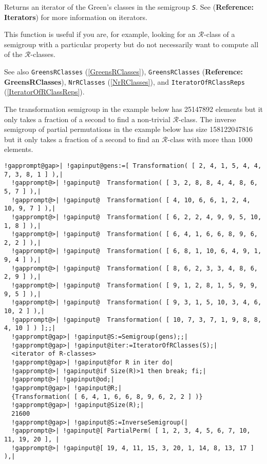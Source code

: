 \documentclass[a4paper,11pt]{report}
\begin{document}
{{{ Returns an iterator of the Green's classes in the semigroup \mbox{\texttt{\mdseries\slshape S}}. See  (\textbf{Reference: Iterators}) for more information on iterators.

 This function is useful if you are, for example, looking for an $\mathcal{R}$-class of a semigroup with a particular property but do not necessarily want
to compute all of the $\mathcal{R}$-classes.

 See also \texttt{GreensRClasses} (\ref{GreensRClasses}), \texttt{GreensRClasses} (\textbf{Reference: GreensRClasses}), \texttt{NrRClasses} (\ref{NrRClasses}), and \texttt{IteratorOfRClassReps} (\ref{IteratorOfRClassReps}).

 The transformation semigroup in the example below has 25147892 elements but it
only takes a fraction of a second to find a non-trivial $\mathcal{R}$-class. The inverse semigroup of partial permutations in the example below has
size 158122047816 but it only takes a fraction of a second to find an $\mathcal{R}$-class with more than 1000 elements. 
\begin{Verbatim}[commandchars=!@|,fontsize=\small,frame=single,label=Example]
  !gapprompt@gap>| !gapinput@gens:=[ Transformation( [ 2, 4, 1, 5, 4, 4, 7, 3, 8, 1 ] ),|
  !gapprompt@>| !gapinput@  Transformation( [ 3, 2, 8, 8, 4, 4, 8, 6, 5, 7 ] ),|
  !gapprompt@>| !gapinput@  Transformation( [ 4, 10, 6, 6, 1, 2, 4, 10, 9, 7 ] ),|
  !gapprompt@>| !gapinput@  Transformation( [ 6, 2, 2, 4, 9, 9, 5, 10, 1, 8 ] ),|
  !gapprompt@>| !gapinput@  Transformation( [ 6, 4, 1, 6, 6, 8, 9, 6, 2, 2 ] ),|
  !gapprompt@>| !gapinput@  Transformation( [ 6, 8, 1, 10, 6, 4, 9, 1, 9, 4 ] ),|
  !gapprompt@>| !gapinput@  Transformation( [ 8, 6, 2, 3, 3, 4, 8, 6, 2, 9 ] ),|
  !gapprompt@>| !gapinput@  Transformation( [ 9, 1, 2, 8, 1, 5, 9, 9, 9, 5 ] ),|
  !gapprompt@>| !gapinput@  Transformation( [ 9, 3, 1, 5, 10, 3, 4, 6, 10, 2 ] ),|
  !gapprompt@>| !gapinput@  Transformation( [ 10, 7, 3, 7, 1, 9, 8, 8, 4, 10 ] ) ];;|
  !gapprompt@gap>| !gapinput@S:=Semigroup(gens);;|
  !gapprompt@gap>| !gapinput@iter:=IteratorOfRClasses(S);|
  <iterator of R-classes>
  !gapprompt@gap>| !gapinput@for R in iter do|
  !gapprompt@>| !gapinput@if Size(R)>1 then break; fi;|
  !gapprompt@>| !gapinput@od;|
  !gapprompt@gap>| !gapinput@R;|
  {Transformation( [ 6, 4, 1, 6, 6, 8, 9, 6, 2, 2 ] )}
  !gapprompt@gap>| !gapinput@Size(R);|
  21600
  !gapprompt@gap>| !gapinput@S:=InverseSemigroup(|
  !gapprompt@>| !gapinput@[ PartialPerm( [ 1, 2, 3, 4, 5, 6, 7, 10, 11, 19, 20 ], |
  !gapprompt@>| !gapinput@[ 19, 4, 11, 15, 3, 20, 1, 14, 8, 13, 17 ] ),|

\end{Verbatim}}}}
\end{document}
